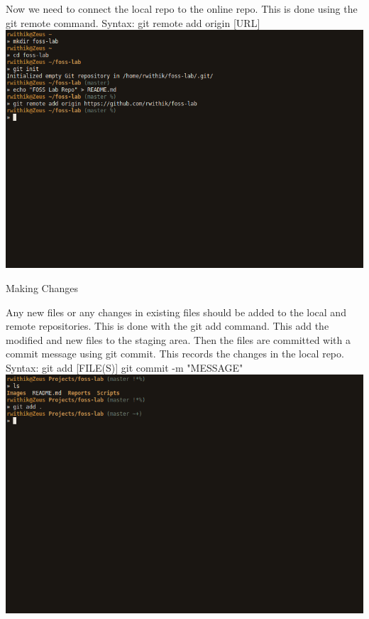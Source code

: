 \documentclass[10pt,a4paper,titlepage]{report}
\begin{document}
\par Now we need to connect the local repo to the  online repo. This is done using the {\color{red} git remote} command. \newline
Syntax: git remote add origin [URL] \newline\newline
\includegraphics[scale=.45]{../Images/VCS/2.png}
\pagebreak
\begin{center}
\Large{Making Changes}
\end{center}
\vspace{.5cm}
\par Any new files or any changes in existing files should be added to the local and remote repositories. This is done with the {\color{red} git add} command. This add the modified and new files to the staging area. Then the files are committed with a commit message using {\color{red} git commit}. This records the changes in the local repo. \newline
Syntax: git add [FILE(S)]\newline
git commit -m "MESSAGE"
\newline\newline
\includegraphics[scale=.45]{../Images/VCS/3.png}\newline\newline
\end{document}
